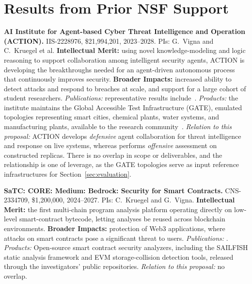 \section{Results from Prior NSF Support}
\label{sec:prior}

\noindent\textbf{AI Institute for Agent-based Cyber Threat Intelligence and
Operation (ACTION).} IIS-2228976, \$21,994,201, 2023--2028. PIs:
G.~Vigna and C.~Kruegel et al.
\textbf{Intellectual Merit:} using novel knowledge-modeling and logic reasoning
to support collaboration among intelligent security agents, ACTION is
developing the breakthroughs needed for an agent-driven autonomous process
that continuously improves security.
\textbf{Broader Impacts:} increased ability to detect attacks and respond to
breaches at scale, and support for a large cohort of student researchers.
\emph{Publications:} representative results
include~\cite{fleischer23:actor,chainreactor,aghakhani2024trojanpuzzle, gibbs2024mango, pletinckx2025proxy}.
\emph{Products:} the institute maintains the Global Accessible Test Infrastructure (GATE), emulated topologies representing smart cities, chemical plants, water systems, and manufacturing plants, available to the research community~\cite{action}.
\emph{Relation to this proposal:} ACTION develops \emph{defensive} agent
collaboration for threat intelligence and response on live systems, whereas
\sysname performs \emph{offensive} assessment on constructed replicas. There
is no overlap in scope or deliverables, and the relationship is one of
leverage, as the GATE topologies serve as input reference infrastructures for
Section~\ref{sec:evaluation}.

\medskip
\noindent\textbf{SaTC: CORE: Medium: Bedrock: Security for Smart Contracts.}
CNS-2334709, \$1,200,000, 2024--2027. PIs: C.~Kruegel and G.~Vigna.
\textbf{Intellectual Merit:} the first multi-chain program analysis platform operating directly on low-level smart-contract bytecode, letting analyses be reused across blockchain environments.
\textbf{Broader Impacts:} protection of Web3 applications, where attacks on smart contracts pose a significant threat to users.
\emph{Publications:} \cite{ruaro24crush,DeSilva2024GuideEnricher,ruaro25:approvals,ruaro25greed, meng2026houston}.
\emph{Products:} Open-source smart contract security analyzers, including the SAILFISH static analysis framework and EVM storage-collision detection tools, released through the investigators' public repositories.
\emph{Relation to this proposal:} no overlap.

